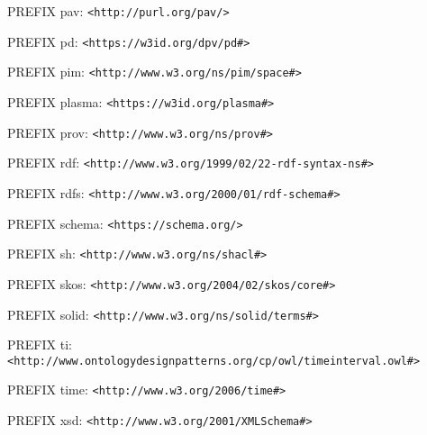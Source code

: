 PREFIX pav: \texttt{<http://purl.org/pav/>}

PREFIX pd: \texttt{<https://w3id.org/dpv/pd\#>}

PREFIX pim: \texttt{<http://www.w3.org/ns/pim/space\#>}

PREFIX plasma: \texttt{<https://w3id.org/plasma\#>}

PREFIX prov: \texttt{<http://www.w3.org/ns/prov\#>}

PREFIX rdf: \texttt{<http://www.w3.org/1999/02/22-rdf-syntax-ns\#>}

PREFIX rdfs: \texttt{<http://www.w3.org/2000/01/rdf-schema\#>}

PREFIX schema: \texttt{<https://schema.org/>}

PREFIX sh: \texttt{<http://www.w3.org/ns/shacl\#>}

PREFIX skos: \texttt{<http://www.w3.org/2004/02/skos/core\#>}

PREFIX solid: \texttt{<http://www.w3.org/ns/solid/terms\#>}

PREFIX ti: \texttt{<http://www.ontologydesignpatterns.org/cp/owl/timeinterval.owl\#>}

PREFIX time: \texttt{<http://www.w3.org/2006/time\#>}

PREFIX xsd: \texttt{<http://www.w3.org/2001/XMLSchema\#>}